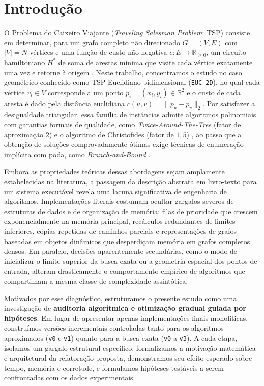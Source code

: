 \section{Introdução}
\label{sec:introducao}

O Problema do Caixeiro Viajante (\textit{Traveling Salesman Problem}: TSP) consiste
em determinar, para um grafo completo não direcionado $G = (V, E)$ com $|V| = N$ vértices e
uma função de custo não negativa $c: E \rightarrow \mathbb{R}_{\ge 0}$, um circuito
hamiltoniano $H^*$ de soma de arestas mínima que visite cada vértice exatamente uma vez e
retorne à origem \cite{cormen2009clrs,levitin2012design}. Neste trabalho, concentramos o estudo
no caso geométrico conhecido como TSP Euclidiano bidimensional (\texttt{EUC\_2D}), no qual cada
vértice $v_i \in V$ corresponde a um ponto $p_i = (x_i, y_i) \in \mathbb{R}^2$ e o custo de
cada aresta é dado pela distância euclidiana $c(u, v) = \|p_u - p_v\|_2$. Por satisfazer a
desigualdade triangular, essa família de instâncias admite algoritmos polinomiais com
garantias formais de qualidade, como \textit{Twice-Around-The-Tree} (fator de aproximação $2$) \cite{rosenkrantz1977analysis} e 
o algoritmo de Christofides (fator de $1{,}5$)
\cite{christofides1976worst}, ao passo que a obtenção de soluções comprovadamente ótimas exige
técnicas de enumeração implícita com poda, como \textit{Branch-and-Bound}
\cite{levitin2012design}.

Embora as propriedades teóricas dessas abordagens sejam amplamente estabelecidas na literatura,
a passagem da descrição abstrata em livro-texto para um sistema executável revela uma lacuna
significativa de engenharia de algoritmos. Implementações literais costumam ocultar gargalos
severos de estruturas de dados e de organização de memória: filas de prioridade que crescem
exponencialmente na memória principal, recálculos redundantes de limites inferiores, cópias
repetidas de caminhos parciais e representações de grafos baseadas em objetos dinâmicos que
desperdiçam memória em grafos completos densos. Em paralelo, decisões aparentemente secundárias,
como o modo de inicializar o limite superior da busca exata ou a geometria espacial dos pontos
de entrada, alteram drasticamente o comportamento empírico de algoritmos que compartilham a
mesma classe de complexidade assintótica.

Motivados por esse diagnóstico, estruturamos o presente estudo como uma investigação de
\textbf{auditoria algorítmica e otimização gradual guiada por hipóteses}. Em lugar de apresentar
apenas implementações finais monolíticas, construímos versões incrementais controladas tanto
para os algoritmos aproximados (\texttt{v0} e \texttt{v1}) quanto para a busca exata
(\texttt{v0} a \texttt{v3}). A cada etapa, isolamos um gargalo estrutural específico,
formalizamos a motivação matemática e arquitetural da refatoração proposta, demonstramos seu
efeito esperado sobre tempo, memória e corretude, e formulamos hipóteses testáveis a serem
confrontadas com os dados experimentais.

